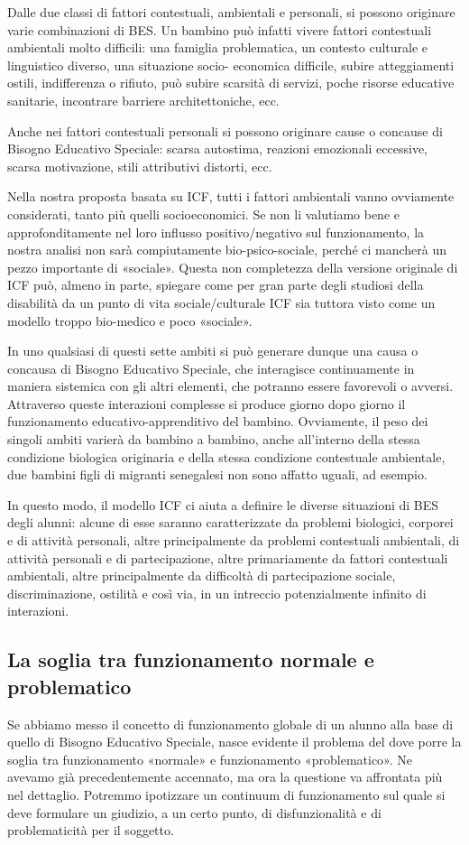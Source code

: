 Dalle due classi di fattori contestuali, ambientali e personali, si possono originare varie
combinazioni di BES. Un bambino può infatti vivere fattori contestuali ambientali molto difficili:
una famiglia problematica, un contesto culturale e linguistico diverso, una situazione socio-
economica difficile, subire atteggiamenti ostili, indifferenza o rifiuto, può subire scarsità di servizi,
poche risorse educative sanitarie, incontrare barriere architettoniche, ecc.

Anche nei fattori contestuali personali si possono originare cause o concause di Bisogno
Educativo Speciale: scarsa autostima, reazioni emozionali eccessive, scarsa motivazione, stili
attributivi distorti, ecc.

Nella nostra proposta basata su ICF, tutti i fattori ambientali vanno ovviamente considerati,
tanto più quelli socioeconomici. Se non li valutiamo bene e approfonditamente nel loro influsso
positivo/negativo sul funzionamento, la nostra analisi non sarà compiutamente bio-psico-sociale,
perché ci mancherà un pezzo importante di «sociale». Questa non completezza della versione
originale di ICF può, almeno in parte, spiegare come per gran parte degli studiosi della disabilità da
un punto di vita sociale/culturale ICF sia tuttora visto come un modello troppo bio-medico e poco
«sociale».

In uno qualsiasi di questi sette ambiti si può generare dunque una causa o concausa di
Bisogno Educativo Speciale, che interagisce continuamente in maniera sistemica con gli altri
elementi, che potranno essere favorevoli o avversi.
Attraverso queste interazioni complesse si produce giorno dopo giorno il funzionamento
educativo-apprenditivo del bambino. Ovviamente, il peso dei singoli ambiti varierà da bambino a
bambino, anche all'interno della stessa condizione biologica originaria e della stessa condizione contestuale ambientale, due bambini figli di migranti senegalesi non sono affatto uguali, ad
esempio.

In questo modo, il modello ICF ci aiuta a definire le diverse situazioni di BES degli alunni:
alcune di esse saranno caratterizzate da problemi biologici, corporei e di attività personali, altre
principalmente da problemi contestuali ambientali, di attività personali e di partecipazione, altre
primariamente da fattori contestuali ambientali, altre principalmente da difficoltà di
partecipazione sociale, discriminazione, ostilità e così via, in un intreccio potenzialmente infinito di
interazioni.
\subsection*{La soglia tra funzionamento normale e problematico}
Se abbiamo messo il concetto di funzionamento globale di un alunno alla base di quello di
Bisogno Educativo Speciale, nasce evidente il problema del dove porre la soglia tra funzionamento
«normale» e funzionamento «problematico». Ne avevamo già precedentemente accennato, ma
ora la questione va affrontata più nel dettaglio. Potremmo ipotizzare un continuum di
funzionamento sul quale si deve formulare un giudizio, a un certo punto, di disfunzionalità e di
problematicità per il soggetto.

